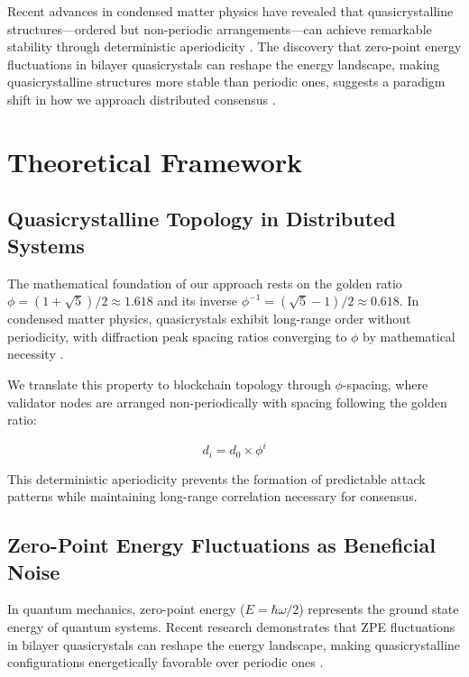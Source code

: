 \documentclass[AMA]{WileyNJD-AMA}
\begin{document}
Recent advances in condensed matter physics have revealed that quasicrystalline structures---ordered but non-periodic arrangements---can achieve remarkable stability through deterministic aperiodicity \cite{shechtman1984}. The discovery that zero-point energy fluctuations in bilayer quasicrystals can reshape the energy landscape, making quasicrystalline structures more stable than periodic ones, suggests a paradigm shift in how we approach distributed consensus \cite{zhang2024}.

\section{Theoretical Framework}

\subsection{Quasicrystalline Topology in Distributed Systems}

The mathematical foundation of our approach rests on the golden ratio $\phi = (1+\sqrt{5})/2 \approx 1.618$ and its inverse $\phi^{-1} = (\sqrt{5}-1)/2 \approx 0.618$. In condensed matter physics, quasicrystals exhibit long-range order without periodicity, with diffraction peak spacing ratios converging to $\phi$ by mathematical necessity \cite{steurer2009}.

We translate this property to blockchain topology through $\phi$-spacing, where validator nodes are arranged non-periodically with spacing following the golden ratio:

\begin{equation}
d_i = d_0 \times \phi^i
\label{eq:phi_spacing}
\end{equation}

This deterministic aperiodicity prevents the formation of predictable attack patterns while maintaining long-range correlation necessary for consensus.

\subsection{Zero-Point Energy Fluctuations as Beneficial Noise}

In quantum mechanics, zero-point energy ($E = \hbar\omega/2$) represents the ground state energy of quantum systems. Recent research demonstrates that ZPE fluctuations in bilayer quasicrystals can reshape the energy landscape, making quasicrystalline configurations energetically favorable over periodic ones \cite{naressi2025}.
\end{document}
